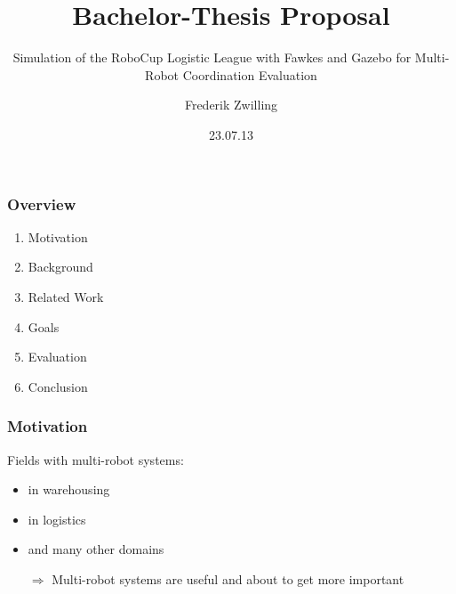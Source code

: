 \documentclass{beamer}
\title{Bachelor-Thesis Proposal}
\subtitle{Simulation of the RoboCup Logistic League with Fawkes and Gazebo for Multi-Robot Coordination Evaluation}
\author {Frederik Zwilling}
\institute{RWTH Aachen}
\date{23.07.13}
\begin{document}
\frame{\titlepage}

\begin{frame}
\frametitle{Overview}
\begin{enumerate}
\item Motivation
\item Background
\item Related Work
\item Goals
\item Evaluation
\item Conclusion
\end{enumerate}
\end{frame}

\begin{frame}
\frametitle{Motivation}
\begin{multicols}{2}
\begin{figure}
\end{figure}
Fields with multi-robot systems:
\begin{itemize}
\item<1-> in warehousing
\item<2-> in logistics
\item<3-> and many other domains
\end{itemize}
\end{multicols}
\pause \pause \pause 
\begin{itemize}
\item[$\Rightarrow$] Multi-robot systems are useful and about to get more important
\end{itemize}
\end{frame}
\end{document}
